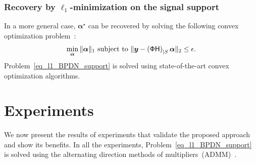 \documentclass{article}
\newcommand{\vect}[1]{\bm{#1}}
\newcommand{\mat}[1]{\mathsf{#1}}
\theoremstyle{definition}
\begin{document}
\subsubsection{Recovery by $\ell_1$-minimization on the signal support}
\label{subsec_ls_recovery}
In a more general case, $\vect{\alpha}^\star$ can be recovered by solving the following convex optimization problem~\cite{candes11}:
\begin{equation}
\label{eq_l1_BPDN_support}
\min_{\vect{\alpha}}\|\vect{\alpha}\|_{1}
\textnormal{ subject to }\| \bm{y}-\left(\mat{\Phi H}\right)_{|S}\vect{\alpha}\|_{2}\leq\epsilon.
\end{equation}
Problem~\eqref{eq_l1_BPDN_support} is solved using state-of-the-art convex optimization algorithms.
\section{Experiments}
\label{sec_exp}
We now present the results of experiments that validate the proposed approach and show its benefits.
In all the experiments, Problem~\eqref{eq_l1_BPDN_support} is solved using the alternating direction methods of multipliers~(ADMM)~\cite{Boyd2010}.
\end{document}
